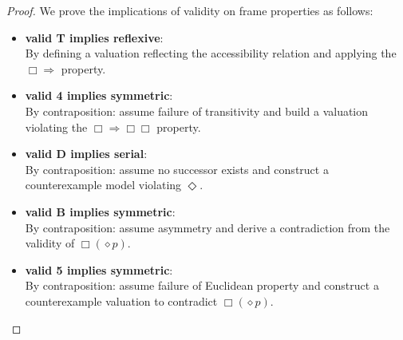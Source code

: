 \begin{proof} \label{proof:definability}
  \leanok
  We prove the implications of validity on frame properties as follows:
  \begin{itemize}
    \item \textbf{valid T implies reflexive}: \leanok \\
    By defining a valuation reflecting the accessibility relation and applying the \(\Box \Rightarrow\) property.

    \item \textbf{valid 4 implies symmetric}: \leanok\\
    By contraposition: assume failure of transitivity and build a valuation violating the \(\Box \Rightarrow \Box\Box\) property.

    \item \textbf{valid D implies serial}: \leanok\\
    By contraposition: assume no successor exists and construct a counterexample model violating \(\Diamond\).

   \item \textbf{valid B implies symmetric}: \leanok\\
    By contraposition: assume asymmetry and derive a contradiction from the validity of \(\Box(\diamond p)\).

    \item \textbf{valid 5 implies symmetric}: \leanok\\
    By contraposition: assume failure of Euclidean property and construct a counterexample valuation to contradict \(\Box(\diamond p)\).
  \end{itemize}
\end{proof}

